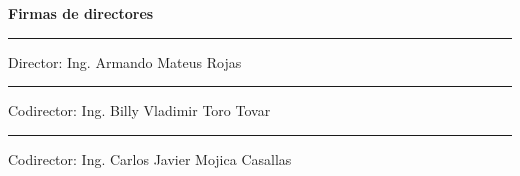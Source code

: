 \begin{titlepage}
\begin{center}

{\large \textbf{Firmas de directores}}

\vspace{2cm}

\noindent\rule{9cm}{0.5pt}

\vspace{0.3cm}

Director: Ing. Armando Mateus Rojas

\vspace{2cm}

\noindent\rule{9cm}{0.5pt}

\vspace{0.3cm}

Codirector: Ing. Billy Vladimir Toro Tovar

\vspace{2cm}

\noindent\rule{9cm}{0.5pt}

\vspace{0.3cm}

Codirector: Ing. Carlos Javier Mojica Casallas

\end{center}
\end{titlepage}
